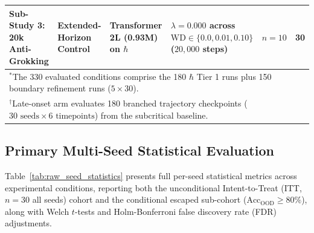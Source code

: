 \documentclass{article}
\theoremstyle{plain}
\theoremstyle{definition}
\begin{document}
\begin{table}[h]
\begin{small}
\begin{sc}
{\begin{tabular}{llllcc}
\textbf{Sub-Study 3: 20k Anti-Grokking} & Extended-Horizon Control & Transformer 2L (0.93M) on $\hbar$ & $\lambda = 0.000$ across $\text{WD} \in \{0.0, 0.01, 0.10\}$ ($20{,}000$ steps) & $n = 10$ & \textbf{30} \\
\bottomrule
\multicolumn{6}{l}{$^*$The 330 evaluated conditions comprise the 180 $\hbar$ Tier 1 runs plus 150 boundary refinement runs ($5 \times 30$).} \\
\multicolumn{6}{l}{$^\dagger$Late-onset arm evaluates 180 branched trajectory checkpoints ($30 \text{ seeds} \times 6 \text{ timepoints}$) from the subcritical baseline.} \\
\end{tabular}%
}
\end{sc}
\end{small}
\end{table}
\subsection{Primary Multi-Seed Statistical Evaluation}
\label{sec:app_multiseed_evaluation}
Table~\ref{tab:raw_seed_statistics} presents full per-seed statistical metrics across experimental conditions, reporting both the unconditional Intent-to-Treat (ITT, $n=30$ all seeds) cohort and the conditional escaped sub-cohort ($\text{Acc}_{\text{OOD}} \ge 80\%$), along with Welch $t$-tests and Holm-Bonferroni false discovery rate (FDR) adjustments.
\end{document}
